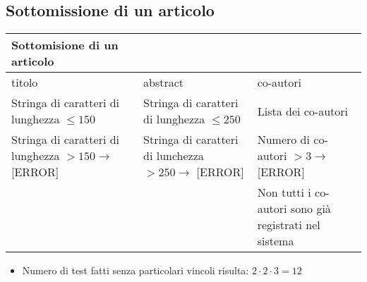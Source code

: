 \subsection{Sottomissione di un articolo}
\label{sec:test_sottomissione}
\begin{tabular}{|p{4cm}|p{4cm}|p{4cm}|}
  \hline
  \rowcolor{SkyBlue}
  Sottomisione di un articolo & & \\
  \hline
  \hline
  titolo & abstract & co-autori \\
  \hline
  Stringa di caratteri di lunghezza \(\leq 150\)  & Stringa di caratteri di lunghezza \(\leq 250\) & Lista dei co-autori \\
  \hline
  Stringa di caratteri di lunghezza \(> 150 \rightarrow\) [ERROR] & Stringa di caratteri di lunchezza \(> 250 \rightarrow\) [ERROR]& Numero di co-autori \(> 3 \rightarrow\) [ERROR]\\
  \hline
   & & Non tutti i co-autori sono già registrati nel sistema\\
  \hline
\end{tabular}
\begin{itemize}
\item Numero di test fatti senza particolari vincoli risulta: \(2\cdot2\cdot3 = 12\)
\end{itemize}

